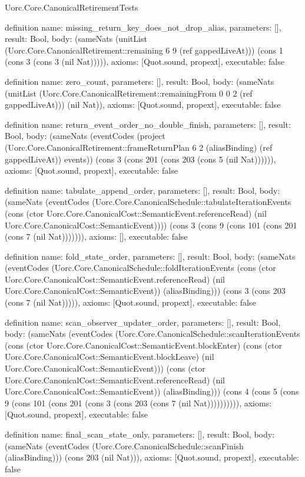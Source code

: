 \begin{lexlean}{Uorc.Core.CanonicalRetirementTests}
\begin{semanticmodule}
definition{
  name: missing_return_key_does_not_drop_alias,
  parameters: [],
  result: Bool,
  body: (sameNats (unitList (Uorc.Core.CanonicalRetirement::remaining 6 9 (ref gappedLiveAt))) (cons 1 (cons 3 (cons 3 (nil Nat))))),
  axioms: [Quot.sound, propext],
  executable: false
}

definition{
  name: zero_count,
  parameters: [],
  result: Bool,
  body: (sameNats (unitList (Uorc.Core.CanonicalRetirement::remainingFrom 0 0 2 (ref gappedLiveAt))) (nil Nat)),
  axioms: [Quot.sound, propext],
  executable: false
}

definition{
  name: return_event_order_no_double_finish,
  parameters: [],
  result: Bool,
  body: (sameNats (eventCodes (project (Uorc.Core.CanonicalRetirement::frameReturnPlan 6 2 (aliasBinding) (ref gappedLiveAt)) events)) (cons 3 (cons 201 (cons 203 (cons 5 (nil Nat)))))),
  axioms: [Quot.sound, propext],
  executable: false
}

definition{
  name: tabulate_append_order,
  parameters: [],
  result: Bool,
  body: (sameNats (eventCodes (Uorc.Core.CanonicalSchedule::tabulateIterationEvents (cons (ctor Uorc.Core.CanonicalCost::SemanticEvent.referenceRead) (nil Uorc.Core.CanonicalCost::SemanticEvent)))) (cons 3 (cons 9 (cons 101 (cons 201 (cons 7 (nil Nat))))))),
  axioms: [],
  executable: false
}

definition{
  name: fold_state_order,
  parameters: [],
  result: Bool,
  body: (sameNats (eventCodes (Uorc.Core.CanonicalSchedule::foldIterationEvents (cons (ctor Uorc.Core.CanonicalCost::SemanticEvent.referenceRead) (nil Uorc.Core.CanonicalCost::SemanticEvent)) (aliasBinding))) (cons 3 (cons 203 (cons 7 (nil Nat))))),
  axioms: [Quot.sound, propext],
  executable: false
}

definition{
  name: scan_observer_updater_order,
  parameters: [],
  result: Bool,
  body: (sameNats (eventCodes (Uorc.Core.CanonicalSchedule::scanIterationEvents (cons (ctor Uorc.Core.CanonicalCost::SemanticEvent.blockEnter) (cons (ctor Uorc.Core.CanonicalCost::SemanticEvent.blockLeave) (nil Uorc.Core.CanonicalCost::SemanticEvent))) (cons (ctor Uorc.Core.CanonicalCost::SemanticEvent.referenceRead) (nil Uorc.Core.CanonicalCost::SemanticEvent)) (aliasBinding))) (cons 4 (cons 5 (cons 9 (cons 101 (cons 201 (cons 3 (cons 203 (cons 7 (nil Nat)))))))))),
  axioms: [Quot.sound, propext],
  executable: false
}

definition{
  name: final_scan_state_only,
  parameters: [],
  result: Bool,
  body: (sameNats (eventCodes (Uorc.Core.CanonicalSchedule::scanFinish (aliasBinding))) (cons 203 (nil Nat))),
  axioms: [Quot.sound, propext],
  executable: false
}


\end{semanticmodule}
\end{lexlean}
